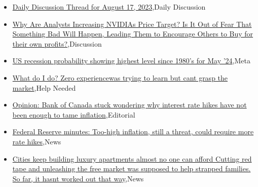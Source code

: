 \documentclass{article}%
\begin{document}
%
\begin{itemize}%
\item%
\href{https://reddit.com/r/wallstreetbets/comments/15tiypl/daily\_discussion\_thread\_for\_august\_17\_2023/}{Daily Discussion Thread for August 17, 2023},Daily Discussion%
\item%
\href{https://reddit.com/r/StockMarket/comments/15tcuqf/why\_are\_analysts\_increasing\_nvidias\_price\_target/}{Why Are Analysts Increasing NVIDIAs Price Target? Is It Out of Fear That Something Bad Will Happen, Leading Them to Encourage Others to Buy for their own profits?},Discussion%
\item%
\href{https://reddit.com/r/StockMarket/comments/15sxpqz/us\_recession\_probability\_showing\_highest\_level/}{US recession probability showing highest level since 1980's for May '24},Meta%
\item%
\href{https://reddit.com/r/StockMarket/comments/15swenu/what\_do\_i\_do\_zero\_experiencewas\_trying\_to\_learn/}{What do I do? Zero experiencewas trying to learn but cant grasp the market},Help Needed%
\item%
\href{https://reddit.com/r/Economics/comments/15tja73/opinion\_bank\_of\_canada\_stuck\_wondering\_why/}{Opinion: Bank of Canada stuck wondering why interest rate hikes have not been enough to tame inflation},Editorial%
\item%
\href{https://reddit.com/r/Economics/comments/15t55r1/federal\_reserve\_minutes\_toohigh\_inflation\_still\_a/}{Federal Reserve minutes: Too-high inflation, still a threat, could require more rate hikes},News%
\item%
\href{https://reddit.com/r/Economics/comments/15t1uf1/cities\_keep\_building\_luxury\_apartments\_almost\_no/}{Cities keep building luxury apartments almost no one can afford  Cutting red tape and unleashing the free market was supposed to help strapped families. So far, it hasnt worked out that way},News%
\end{itemize}%
\end{document}
